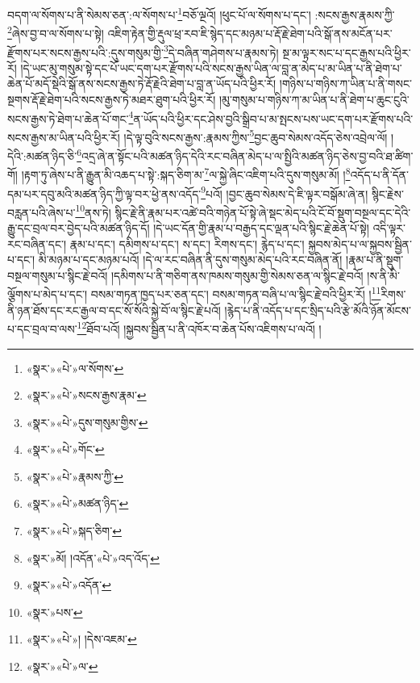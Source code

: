 བདག་ལ་སོགས་པ་ནི་སེམས་ཅན་:ལ་སོགས་པ་\footnote{«སྣར་»«པེ་»ལ་སོགས་}བཅོ་ལྔའོ། །ཕུང་པོ་ལ་སོགས་པ་དང་། :སངས་རྒྱས་རྣམས་ཀྱི་\footnote{«སྣར་»«པེ་»སངས་རྒྱས་རྣམ་}ཞེས་བྱ་བ་ལ་སོགས་པ་སྟེ། འཇིག་རྟེན་གྱི་རྡུལ་ཕྲ་རབ་ཇི་སྙེད་དང་མཉམ་པ་རྡོ་རྗེ་ཐེག་པའི་སྒོ་ནས་མངོན་པར་རྫོགས་པར་སངས་རྒྱས་པའི་:དུས་གསུམ་གྱི་\footnote{«སྣར་»«པེ་»དུས་གསུམ་གྱིས་}དེ་བཞིན་གཤེགས་པ་རྣམས་ཏེ། སྔ་མ་ལྟར་སང་པ་དང་རྒྱས་པའི་ཕྱིར་རོ། །དེ་ཡང་མུ་གསུམ་སྟེ་དང་པོ་ཡང་དག་པར་རྫོགས་པའི་སངས་རྒྱས་ཡིན་ལ་བླ་ན་མེད་པ་མ་ཡིན་པ་ནི་ཐེག་པ་ཆེན་པོ་མདོ་སྡེའི་སྒོ་ནས་སངས་རྒྱས་ཏེ་རྡོ་རྗེའི་ཐེག་པ་བླ་ན་ཡོད་པའི་ཕྱིར་རོ། །གཉིས་པ་གཉིས་ཀ་ཡིན་པ་ནི་གསང་སྔགས་རྡོ་རྗེ་ཐེག་པའི་སངས་རྒྱས་ཏེ་མཐར་ཐུག་པའི་ཕྱིར་རོ། །མུ་གསུམ་པ་གཉིས་ཀ་མ་ཡིན་པ་ནི་ཐེག་པ་ཆུང་ངུའི་སངས་རྒྱས་ཏེ་ཐེག་པ་ཆེན་པོ་གང་\footnote{«སྣར་»«པེ་»གོང་}ན་ཡོད་པའི་ཕྱིར་དང་ཤེས་བྱའི་སྒྲིབ་པ་མ་སྤངས་པས་ཡང་དག་པར་རྫོགས་པའི་སངས་རྒྱས་མ་ཡིན་པའི་ཕྱིར་རོ། །དེ་ལྟ་བུའི་སངས་རྒྱས་:རྣམས་ཀྱིས་\footnote{«སྣར་»«པེ་»རྣམས་ཀྱི་}བྱང་ཆུབ་སེམས་འདོད་ཅེས་འབྲེལ་ལོ། །དེའི་:མཚན་ཉིད་ཅི་\footnote{«སྣར་»«པེ་»མཚན་ཉིད་}འདྲ་ཞེ་ན་སྟོང་པའི་མཚན་ཉིད་དེའི་རང་བཞིན་མེད་པ་ལ་སྤྱིའི་མཚན་ཉིད་ཅེས་བྱ་བའི་ཐ་ཚིག་གོ། །རྟག་ཏུ་ཞེས་པ་ནི་རྒྱུན་མི་འཆད་པ་སྟེ་:སྐད་ཅིག་མ་\footnote{«སྣར་»«པེ་»སྐད་ཅིག་}ལ་སྐྱེ་ཞིང་འཇིག་པའི་དུས་གསུམ་མོ། །\footnote{«སྣར་»མོ། །འདོན་«པེ་»འད་འོད་}འདོད་པ་ནི་དོན་དམ་པར་དབུ་མའི་མཚན་ཉིད་ཀྱི་ལྟ་བར་ཕྱེ་ནས་འདོད་\footnote{«སྣར་»«པེ་»འདོན་}པའོ། །བྱང་ཆུབ་སེམས་དེ་ཇི་ལྟར་བསྒོམ་ཞེ་ན། སྙིང་རྗེས་བརླན་པའི་ཞེས་པ་\footnote{«སྣར་»པས་}ནས་ཏེ། སྙིང་རྗེ་ནི་རྣམ་པར་འཚེ་བའི་གཉེན་པོ་སྟེ་ཞེ་སྡང་མེད་པའི་ངོ་བོ་སྡུག་བསྔལ་དང་དེའི་རྒྱུ་དང་བྲལ་བར་བྱེད་པའི་མཚན་ཉིད་དོ། །དེ་ཡང་དོན་གྱི་རྣམ་པ་བརྒྱད་དང་ལྡན་པའི་སྙིང་རྗེ་ཆེན་པོ་སྟེ། འདི་ལྟར་རང་བཞིན་དང་། རྣམ་པ་དང་། དམིགས་པ་དང་། ས་དང་། རིགས་དང་། རྙེད་པ་དང་། སྐྱབས་མེད་པ་ལ་སྐྱབས་སྦྱིན་པ་དང་། མི་མཉམ་པ་དང་མཉམ་པའོ། །དེ་ལ་རང་བཞིན་ནི་དུས་གསུམ་མེད་པའི་རང་བཞིན་ནོ། །རྣམ་པ་ནི་སྡུག་བསྔལ་གསུམ་པ་སྙིང་རྗེ་བའོ། །དམིགས་པ་ནི་གཅིག་ནས་ཁམས་གསུམ་གྱི་སེམས་ཅན་ལ་སྙིང་རྗེ་བའོ། །ས་ནི་མི་ལྕོགས་པ་མེད་པ་དང་། བསམ་གཏན་ཁྱད་པར་ཅན་དང་། བསམ་གཏན་བཞི་པ་ལ་སྙིང་རྗེ་བའི་ཕྱིར་རོ། །\footnote{«སྣར་»«པེ་»། །དེས་འཇམ་}རིགས་ནི་ཉན་ཐོས་དང་རང་རྒྱལ་བ་དང་སོ་སོའི་སྐྱེ་བོ་ལ་སྙིང་རྗེ་པའོ། །རྙེད་པ་ནི་འདོད་པ་དང་སྲིད་པའི་རྩེ་མོའི་ཉོན་མོངས་པ་དང་བྲལ་བ་ལས་\footnote{«སྣར་»«པེ་»ལ་}ཐོབ་པའོ། །སྐྱབས་སྦྱིན་པ་ནི་འཁོར་བ་ཆེན་པོས་འཇིགས་པ་ལའོ། །
